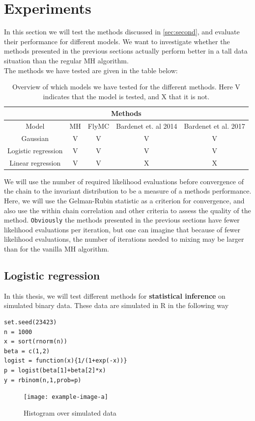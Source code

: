 \chapter{Experiments}\label{chap:experiments}
In this section we will test the methods discussed in \ref{sec:second}, and evaluate their performance for different models. We want to investigate whether the methods presented in the previous sections actually perform better in a tall data situation than the regular MH algorithm.  \\
The methods we have tested are given in the table below: 

\begin{table}[H]
    \centering
        \begin{tabular}{|c|c|c|c|c|}
    \hline
    \multicolumn{5}{|c|}{Methods} \\
    \hline
   Model & MH & FlyMC & Bardenet et. al 2014 & Bardenet et al. 2017\\ \hline\hline
        Gaussian & V & V & V &V \\
        Logistic regression &V &V &V &V  \\
        Linear regression &V & V& X& X \\ \hline
    \end{tabular}{}
    \caption{Overview of which models we have tested for the different methods. Here V indicates that the model is tested, and X that it is not.}
    \label{tab:experiment_overview}
\end{table}{}
We will use the number of required likelihood evaluations before convergence of the chain to the invariant distribution to be a measure of a methods performance.
Here, we will use the Gelman-Rubin statistic as a criterion for convergence, and also use the within chain correlation and other criteria to assess the quality of the method. 
\texttt{Obviously} the methods presented in the previous sections have fewer likelihood evaluations per iteration, but one can imagine that because of fewer likelihood evaluations, the number of iterations needed to mixing may be larger than for the vanilla MH algorithm. 


\section{Logistic regression}\label{subsec:data}
In this thesis, we will test different methods for \textbf{statistical inference} on simulated binary data. These data are simulated in R in the following way
\begin{lstlisting}[caption={simulation of binary data}, label={lst:simulation}]
set.seed(23423)
n = 1000
x = sort(rnorm(n))
beta = c(1,2)
logist = function(x){1/(1+exp(-x))}
p = logist(beta[1]+beta[2]*x)
y = rbinom(n,1,prob=p)
\end{lstlisting}
\begin{figure}
    \centering
    \texttt{[image: example-image-a]}
    \caption{Histogram over simulated data}
    \label{fig:my_label}
\end{figure}{}


